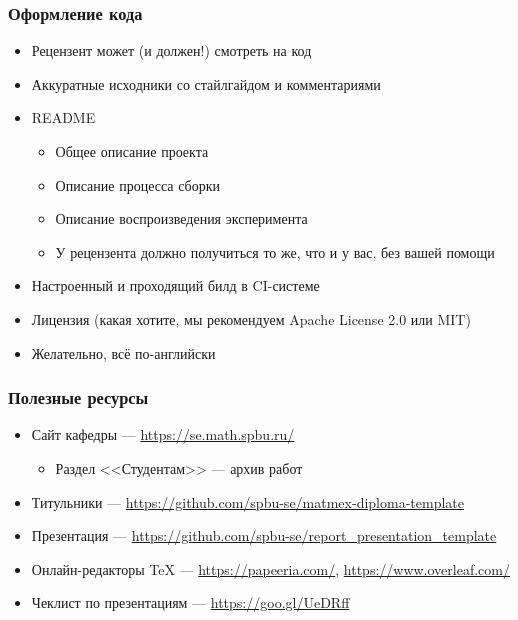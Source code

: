 \documentclass[xetex,mathserif,serif]{beamer}
\begin{document}
    \begin{frame}
        \frametitle{Оформление кода}
        \begin{itemize}
            \item Рецензент может (и должен!) смотреть на код
            \item Аккуратные исходники со стайлгайдом и комментариями
            \item README 
            \begin{itemize}
                \item Общее описание проекта
                \item Описание процесса сборки
                \item Описание воспроизведения эксперимента
                \item У рецензента должно получиться то же, что и у вас, без вашей помощи
            \end{itemize}
            \item Настроенный и проходящий билд в CI-системе
            \item Лицензия (какая хотите, мы рекомендуем Apache License 2.0 или MIT)
            \item Желательно, всё по-английски
        \end{itemize}
    \end{frame}

    \begin{frame}
        \frametitle{Полезные ресурсы}
        \begin{itemize}
            \item Сайт кафедры --- \url{https://se.math.spbu.ru/}
            \begin{itemize}
                \item Раздел <<Студентам>> --- архив работ
            \end{itemize}
            \item Титульники --- \url{https://github.com/spbu-se/matmex-diploma-template}
            \item Презентация --- \url{https://github.com/spbu-se/report_presentation_template}
            \item Онлайн-редакторы TeX --- \url{https://papeeria.com/}, \url{https://www.overleaf.com/}
            \item Чеклист по презентациям --- \url{https://goo.gl/UeDRff}
        \end{itemize}
    \end{frame}
\end{document}
